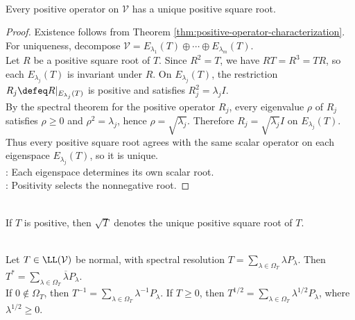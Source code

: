 \begin{proposition} \label{prop:positive-square-root-unique} \\
Every positive operator on $\mathcal{V}$ has a unique positive square root.
\begin{proof}
Existence follows from Theorem \ref{thm:positive-operator-characterization}. For uniqueness, decompose $\mathcal{V}=E_{\lambda_1}(T)\oplus\cdots\oplus E_{\lambda_m}(T)$.\\
Let $R$ be a positive square root of $T$. Since $R^2=T$, we have $RT=R^3=TR$, so each $E_{\lambda_j}(T)$ is invariant under $R$. On $E_{\lambda_j}(T)$, the restriction $R_j\defeq R|_{E_{\lambda_j}(T)}$ is positive and satisfies $R_j^2=\lambda_jI$.\\
By the spectral theorem for the positive operator $R_j$, every eigenvalue $\rho$ of $R_j$ satisfies $\rho\geq0$ and $\rho^2=\lambda_j$, hence $\rho=\sqrt{\lambda_j}$. Therefore $R_j=\sqrt{\lambda_j}I$ on $E_{\lambda_j}(T)$.\\
Thus every positive square root agrees with the same scalar operator on each eigenspace $E_{\lambda_j}(T)$, so it is unique.\\
: Each eigenspace determines its own scalar root.\\
: Positivity selects the nonnegative root.
\end{proof}
\end{proposition}

\begin{definition} \label{def:positive-square-root-notation} \\
If $T$ is positive, then $\sqrt{T}$ denotes the unique positive square root of $T$.
\end{definition}

\begin{example} \label{ex:spectral-functional-calculus-basic-functions} \\
Let $T\in\LL(\mathcal{V})$ be normal, with spectral resolution $T=\sum\limits_{\lambda\in\Omega_T}\lambda P_{\lambda}$. Then $T^*=\sum\limits_{\lambda\in\Omega_T}\overline{\lambda}P_{\lambda}$.\\
If $0\notin\Omega_T$, then $T^{-1}=\sum\limits_{\lambda\in\Omega_T}\lambda^{-1}P_{\lambda}$. If $T\geq0$, then $T^{1/2}=\sum\limits_{\lambda\in\Omega_T}\lambda^{1/2}P_{\lambda}$, where $\lambda^{1/2}\geq0$.
\end{example}

